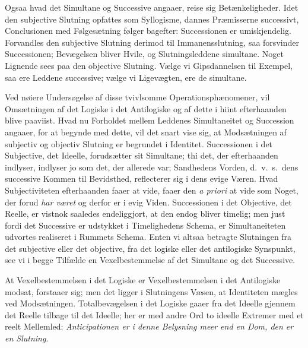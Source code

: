 \documentclass[12pt]{book}
\newcommand{\opage}[1]{\marginnote{\footnotesize\textit{[#1]}}}
\begin{document}
\opage{401}Ogsaa hvad det Simultane og Successive angaaer, reise sig Betænkeligheder. Idet den subjective Slutning opfattes som Syllogisme, dannes Præmisserne successivt, Conclusionen med Følgesætning følger bagefter: Successionen er umiskjendelig. Forvandles den subjective Slutning derimod til Immanensslutning, saa forsvinder Successionen; Bevægelsen bliver Hvile, og Slutningsleddene simultane. Noget Lignende sees paa den objective Slutning. Vælge vi Gipsdannelsen til Exempel, saa ere Leddene successive; vælge vi Ligevægten, ere de simultane.

Ved nøiere Undersøgelse af disse tvivlsomme Operationsphænomener, vil Omsætningen af det Logiske i det Antilogiske og af dette i hiint efterhaanden blive paaviist. Hvad nu Forholdet mellem Leddenes Simultaneitet og Succession angaaer, for at begynde med dette, vil det snart vise sig, at Modsætningen af subjectiv og objectiv Slutning er begrundet i Identitet. Successionen i det Subjective, det Ideelle, forudsætter sit Simultane; thi det, der efterhaanden indlyser, indlyser jo som det, der allerede var; Sandhedens Vorden, d.\ v.\ s.\ dens successive Kommen til Bevidsthed, reflecterer sig i dens evige Væren. Hvad Subjectiviteten efterhaanden faaer at vide, faaer den \textit{a priori} at vide som Noget, der forud \emph{har været} og derfor er i evig Viden. Successionen i det Objective, det Reelle, er vistnok saaledes endeliggjort, at den endog bliver timelig; men just fordi det Successive er udstykket i Timelighedens Schema, er Simultaneiteten udvortes realiseret i Rummets Schema. Enten vi altsaa betragte Slutningen fra det subjective eller det objective, fra det logiske eller det antilogiske Synspunkt, see vi i begge Tilfælde en Vexelbestemmelse af det Simultane og det Successive.

At Vexelbestemmelsen i det Logiske er Vexelbestemmelsen i det Antilogiske modsat, forstaaer sig; men det ligger i Slutningens Væsen, at Identiteten mægles ved Modsætningen. Totalbevægelsen i det Logiske gaaer fra det Ideelle gjennem
\opage{402}det Reelle tilbage til det Ideelle; her er med andre Ord to ideelle Extremer med et reelt Mellemled: \emph{Anticipationen er i denne Belysning meer end en Dom, den er en Slutning}.
\end{document}
